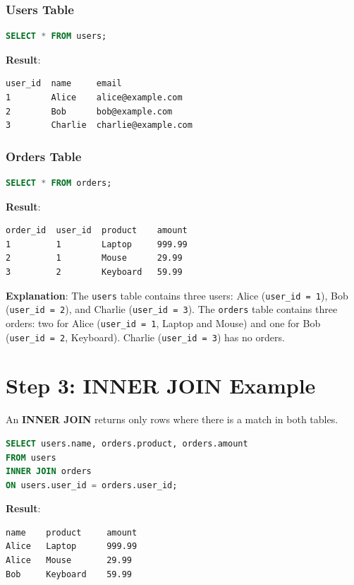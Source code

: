 \documentclass{article}
\begin{document}
\subsubsection{Users Table}
\begin{lstlisting}[language=SQL]
SELECT * FROM users;
\end{lstlisting}

\textbf{Result}:
\begin{verbatim}
user_id  name     email
1        Alice    alice@example.com
2        Bob      bob@example.com
3        Charlie  charlie@example.com
\end{verbatim}

\subsubsection{Orders Table}
\begin{lstlisting}[language=SQL]
SELECT * FROM orders;
\end{lstlisting}

\textbf{Result}:
\begin{verbatim}
order_id  user_id  product    amount
1         1        Laptop     999.99
2         1        Mouse      29.99
3         2        Keyboard   59.99
\end{verbatim}

\textbf{Explanation}: The \texttt{users} table contains three users: Alice (\texttt{user\_id = 1}), Bob (\texttt{user\_id = 2}), and Charlie (\texttt{user\_id = 3}). The \texttt{orders} table contains three orders: two for Alice (\texttt{user\_id = 1}, Laptop and Mouse) and one for Bob (\texttt{user\_id = 2}, Keyboard). Charlie (\texttt{user\_id = 3}) has no orders.

\section*{Step 3: INNER JOIN Example}
An \textbf{INNER JOIN} returns only rows where there is a match in both tables.

\begin{lstlisting}[language=SQL]
SELECT users.name, orders.product, orders.amount
FROM users
INNER JOIN orders
ON users.user_id = orders.user_id;
\end{lstlisting}

\textbf{Result}:
\begin{verbatim}
name    product     amount
Alice   Laptop      999.99
Alice   Mouse       29.99
Bob     Keyboard    59.99
\end{verbatim}
\end{document}
